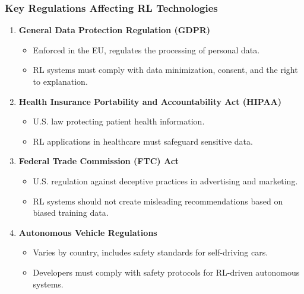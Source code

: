\documentclass{beamer}
\begin{document}
\begin{frame}[fragile]
    \frametitle{Key Regulations Affecting RL Technologies}
    \begin{enumerate}
        \item \textbf{General Data Protection Regulation (GDPR)}
            \begin{itemize}
                \item Enforced in the EU, regulates the processing of personal data.
                \item RL systems must comply with data minimization, consent, and the right to explanation.
            \end{itemize}
        \item \textbf{Health Insurance Portability and Accountability Act (HIPAA)}
            \begin{itemize}
                \item U.S. law protecting patient health information.
                \item RL applications in healthcare must safeguard sensitive data.
            \end{itemize}
        \item \textbf{Federal Trade Commission (FTC) Act}
            \begin{itemize}
                \item U.S. regulation against deceptive practices in advertising and marketing.
                \item RL systems should not create misleading recommendations based on biased training data.
            \end{itemize}
        \item \textbf{Autonomous Vehicle Regulations}
            \begin{itemize}
                \item Varies by country, includes safety standards for self-driving cars.
                \item Developers must comply with safety protocols for RL-driven autonomous systems.
            \end{itemize}
    \end{enumerate}
\end{frame}
\end{document}
